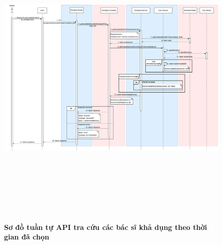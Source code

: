 \begin{figure}[H]
	\centering
	\includegraphics[width=15cm,height=15cm]{Images/api_sequence/schedule/getAvailableDoctorByScheduleTime.drawio.png}
	\caption[Sơ đồ tuần tự API tra cứu các bác sĩ khả dụng theo thời gian đã chọn]{\bfseries \fontsize{12pt}{0pt}\selectfont Sơ đồ tuần tự API tra cứu các bác sĩ khả dụng theo thời gian đã chọn}
	\label{sequence_diagram_get_available_with_time}
\end{figure}

